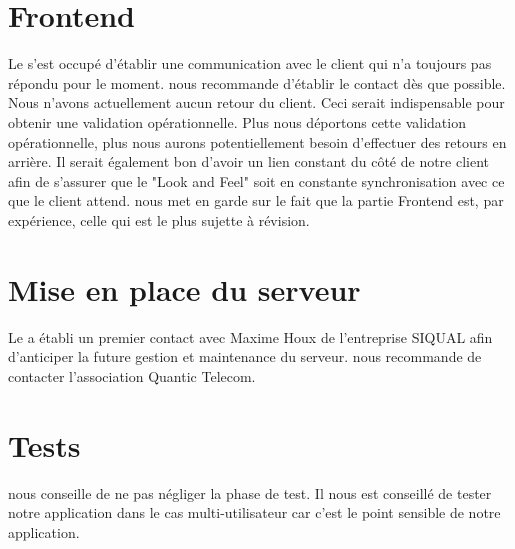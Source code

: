 \documentclass [a4paper] {article}
\begin{document}
\section{Frontend}
Le \CP{} s'est occupé d'établir une communication avec le client qui n'a toujours pas répondu pour le moment. \nomTuteurPedago{} nous recommande d'établir le contact dès que possible. Nous n'avons actuellement aucun retour du client. Ceci serait indispensable pour obtenir une validation opérationnelle. Plus nous déportons cette validation opérationnelle, plus nous aurons potentiellement besoin d'effectuer des retours en arrière. Il serait également bon d'avoir un lien constant du côté de notre client afin de s'assurer que le "Look and Feel" soit en constante synchronisation avec ce que le client attend. \nomTuteurPedago{} nous met en garde sur le fait que la partie Frontend est, par expérience, celle qui est le plus sujette à révision.

\section{Mise en place du serveur}
Le \CP{} a établi un premier contact avec Maxime Houx de l'entreprise SIQUAL afin d'anticiper la future gestion et maintenance du serveur. \nomTuteurPedago{} nous recommande de contacter l'association Quantic Telecom.

\section{Tests}
\nomTuteurPedago{} nous conseille de ne pas négliger la phase de test. Il nous est conseillé de tester notre application dans le cas multi-utilisateur car c'est le point sensible de notre application.


\newpage
\end{document}
